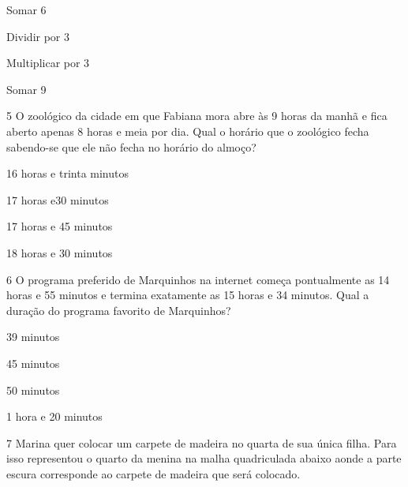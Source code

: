 {\begin{escolha}
\item
  Somar 6
\item
  Dividir por 3
\item
  Multiplicar por 3
\item
  Somar 9
\end{escolha}


\num{5} O zoológico da cidade em que Fabiana mora abre às 9 horas da manhã
e fica aberto apenas 8 horas e meia por dia. Qual o horário que o
zoológico fecha sabendo-se que ele não fecha no horário do almoço?

\begin{escolha}
\item
  16 horas e trinta minutos
\item
  17 horas e30 minutos
\item
  17 horas e 45 minutos
\item
  18 horas e 30 minutos
\end{escolha}


\num{6} O programa preferido de Marquinhos na internet começa pontualmente
as 14 horas e 55 minutos e termina exatamente as 15 horas e 34 minutos.
Qual a duração do programa favorito de Marquinhos?

\begin{escolha}
\item
  39 minutos
\item
  45 minutos
\item
  50 minutos
\item
  1 hora e 20 minutos
\end{escolha}


\num{7} Marina quer colocar um carpete de madeira no quarta de sua única
filha. Para isso representou o quarto da menina na malha quadriculada
abaixo aonde a parte escura corresponde ao carpete de madeira que será
colocado.

}
